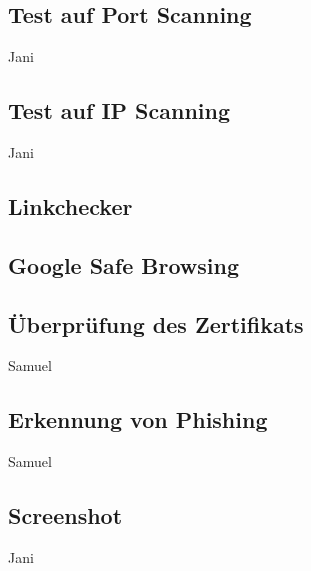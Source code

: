 \subsection{Test auf Port Scanning}

\todo Jani

\subsection{Test auf IP Scanning}

\todo Jani

\subsection{Linkchecker}

\subsection{Google Safe Browsing}

\subsection{Überprüfung des Zertifikats}

\todo Samuel

\subsection{Erkennung von Phishing}

\todo Samuel

\subsection{Screenshot}

\todo Jani
